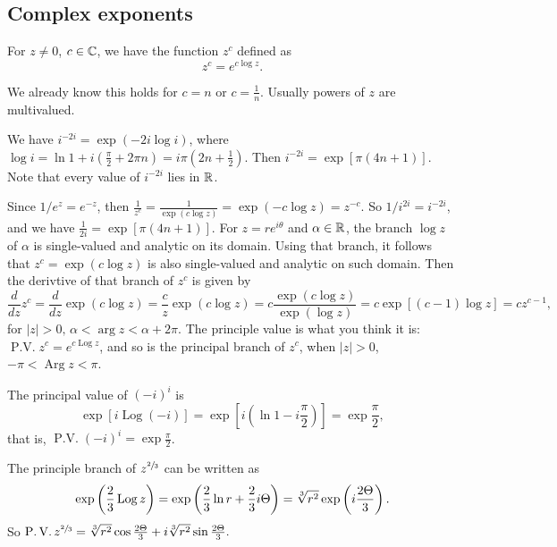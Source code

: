 \subsection{Complex exponents}
\begin{definition}
For $z\neq 0$, $c\in \mathbb{C}$, we have the function $z^{c}$ defined as 
\begin{equation}
z^{c}=e^{c \log z}.
\end{equation}
\end{definition}
 We already know this holds for $c=n$ or $c=\frac{1}{n}$. Usually powers of $z$ are multivalued.
 \begin{example}
     We have $i^{-2i}=\exp (-2i \log i)$, where $\log i = \ln 1 + i\left( \frac{\pi}{2}+2\pi n \right) =i\pi\left( 2n+\frac{1}{2} \right).$ Then $i^{-2i}=\exp[\pi(4n+1)]$. Note that every value of $i^{-2i}$ lies in $\mathbb{R}$.
 \end{example}
 Since $1 /e^{z}=e^{-z}$, then $\frac{1}{z^{c}}=\frac{1}{\exp(c \log z)}=\exp(-c \log z)=z^{-c}$. So $1 /i^{2i}=i^{-2i}$, and we have $\frac{1}{2i}=\exp[\pi(4n+1)]$. For $z=re^{i\theta}$ and $\alpha \in \mathbb{R}$, the branch $\log z$ of $\alpha $ is single-valued and analytic on its domain. Using that branch, it follows that $z^{c}=\exp(c\log z)$ is also single-valued and analytic on such domain. Then the derivtive of that branch of $z^{c}$ is given by \[
     \frac{d}{dz}z^{c}=\frac{d}{dz}\exp(c \log z)=\frac{c}{z}\exp (c \log z)=c \frac{\exp(c \log z)}{\exp(\log z)}=c\exp[(c-1)\log z]=cz^{c-1},
 \] for $|z|>0,\, \alpha<\operatorname{arg}z<\alpha +2\pi $. The principle value is what you think it is: $\operatorname{P.V.}z^{c}=e^{c \operatorname{Log}z}$, and so is the principal branch of $z^{c}$, when $|z|>0$, $-\pi<\operatorname{Arg}z<\pi$.
 \begin{example}
     The principal value of $(-i)^{i}$ is \[
         \exp[i\operatorname{Log}(-i)]=\exp\left[ i\left( \ln 1-i \frac{\pi}{2} \right)  \right] =\exp \frac{\pi}{2},
     \] that is, $\operatorname{P.V.}(-i)^{i}=\exp \frac{\pi}{2}$.
 \end{example}
 \begin{example}
     The principle branch of $z^{\sfrac{2}{3}}$ can be written as \[
         \exp\left( \frac{2}{3}\operatorname{Log}z \right) =\exp\left( \frac{2}{3}\ln r + \frac{2}{3}i\Theta \right) =\sqrt[\leftroot{0}3]{r^2} \exp\left( i \frac{2\Theta}{3} \right) .
     \] So $\operatorname{P.V.}z^{\sfrac{2}{3}}=\sqrt[\leftroot{0}3]{r^2}\cos \frac{2\Theta}{3}+i\sqrt[\leftroot{0}3]{r^2} \sin \frac{2\Theta}{3}. $ 
 \end{example}
